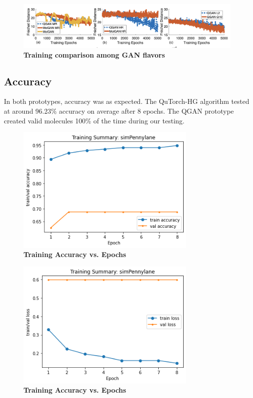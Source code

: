 \documentclass{scrartcl}
\begin{document}
\begin{figure}[htbp]
\centering
\includegraphics[width=.9\linewidth]{./assets/quganresults.png}
\caption{\textbf{Training comparison among GAN flavors}}
\end{figure}

\subsection{Accuracy}
\label{sec:org6d3f062}

In both prototypes, accuracy was as expected. The QuTorch-HG algorithm tested at around 96.23\% accuracy on average after 8 epochs. The QGAN prototype created valid molecules 100\% of the time during our testing.

\begin{figure}[htbp]
\centering
\includegraphics[width=250pt]{./assets/output1.png}
\caption{\textbf{Training Accuracy vs. Epochs}}
\end{figure}
\begin{figure}[htbp]
\centering
\includegraphics[width=250pt]{./assets/output2.png}
\caption{\textbf{Training Accuracy vs. Epochs}}
\end{figure}
\end{document}

